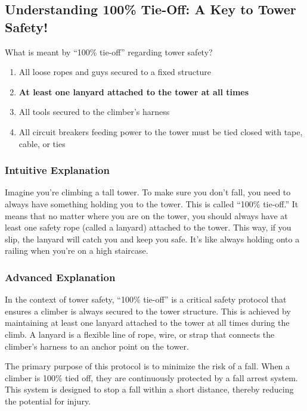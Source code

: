 \subsection{Understanding 100\% Tie-Off: A Key to Tower Safety!}

\begin{tcolorbox}[colback=gray!10!white,colframe=black!75!black,title=E0A07] What is meant by “100\% tie-off” regarding tower safety?
    \begin{enumerate}[label=\Alph*)]
        \item All loose ropes and guys secured to a fixed structure
        \item \textbf{At least one lanyard attached to the tower at all times}
        \item All tools secured to the climber’s harness
        \item All circuit breakers feeding power to the tower must be tied closed with tape, cable, or ties
    \end{enumerate}
\end{tcolorbox}

\subsubsection{Intuitive Explanation}
Imagine you’re climbing a tall tower. To make sure you don’t fall, you need to always have something holding you to the tower. This is called “100\% tie-off.” It means that no matter where you are on the tower, you should always have at least one safety rope (called a lanyard) attached to the tower. This way, if you slip, the lanyard will catch you and keep you safe. It’s like always holding onto a railing when you’re on a high staircase.

\subsubsection{Advanced Explanation}
In the context of tower safety, “100\% tie-off” is a critical safety protocol that ensures a climber is always secured to the tower structure. This is achieved by maintaining at least one lanyard attached to the tower at all times during the climb. A lanyard is a flexible line of rope, wire, or strap that connects the climber’s harness to an anchor point on the tower. 

The primary purpose of this protocol is to minimize the risk of a fall. When a climber is 100\% tied off, they are continuously protected by a fall arrest system. This system is designed to stop a fall within a short distance, thereby reducing the potential for injury. 

